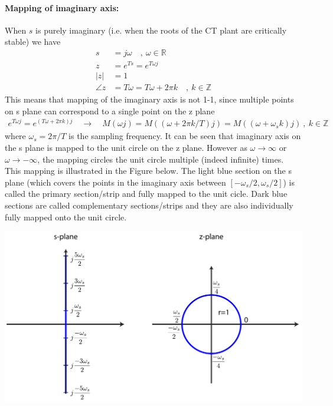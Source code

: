 \documentclass[twoside]{article}
\begin{document}
\paragraph{Mapping of imaginary axis:} 
%
When $s$ is purely imaginary (i.e. when the roots of the CT plant
are critically stable) we have
\begin{align*}
s &= j \omega \quad , \ \omega \in \mathbb{R} \\
z &= e^{Ts} = e^{T \omega j} \\
| z | &= 1 \\ 
\angle z &=  T \omega = T \omega + 2 \pi k  \quad , \ k \in \mathbb{Z}
\end{align*}
%
This means that mapping of the imaginary axis is not 1-1, since
multiple points on s plane can correspond to a single point on the 
z plane
%
\begin{align*}
e^{T \omega j} = e^{ \left( T \omega + 2 \pi k \right) j} \quad \rightarrow \quad
  M(\omega j) = M ( (\omega + 2\pi k / T) j ) =  M ( (\omega +
  \omega_s k) j ) \ , \ k \in \mathbb{Z}
\end{align*}
%
where $\omega_s = 2\pi / T$ is the sampling frequency. It can be seen
that imaginary axis on the s plane is mapped to the unit circle on the
z plane. However as $\omega \to \infty$ or $\omega \to -\infty$, 
the mapping circles the unit circle multiple (indeed infinite)
times. This mapping is illustrated in the Figure below. The light blue 
section on the s plane (which covers the points in the imaginary axis
between $[-\omega_s/2 , \omega_s/2]$) is called the primary
section/strip and fully mapped to the unit cicle. Dark blue sections
are called complementary sections/strips and they are also
individually fully mapped onto the unit circle. 
%
    \begin{center}
\begin{minipage}[h]{0.75\linewidth}
    \begin{center}
      \includegraphics[width=\textwidth]{imag}
    \end{center}
\end{minipage}
    \end{center}
%
\end{document}

